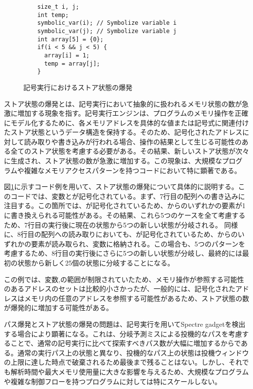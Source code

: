 \begin{figure}
  \begin{verbatim}
    size_t i, j;
    int temp;
    symbolic_var(i); // Symbolize variable i
    symbolic_var(j); // Symbolize variable j
    int array[5] = {0};
    if(i < 5 && j < 5) {
      array[i] = 1;
      temp = array[j];
    }
\end{verbatim}
  \caption{記号実行におけるストア状態の爆発}
  \label{store_explosion}
\end{figure}


ストア状態の爆発とは、記号実行において抽象的に扱われるメモリ状態の数が急激に増加する現象を指す。記号実行エンジンは、プログラムのメモリ操作を正確にモデル化するために、各メモリアドレスを具体的な値または記号式に関連付けたストア状態というデータ構造を保持する。そのため、記号化されたアドレスに対して読み取りや書き込みが行われる場合、操作の結果として生じる可能性のある全てのストア状態を考慮する必要がある。その結果、新しいストア状態が次々に生成され、ストア状態の数が急激に増加する。この現象は、大規模なプログラムや複雑なメモリアクセスパターンを持つコードにおいて特に顕著である。\par

図\ref{store_explosion}に示すコード例を用いて、ストア状態の爆発について具体的に説明する。このコードでは、変数とが記号化されている。まず、7行目の配列への書き込みに注目する。この箇所では、が記号化されているため、からのいずれかの要素が1に書き換えられる可能性がある。その結果、これら5つのケースを全て考慮するため、7行目の実行後に現在の状態から5つの新しい状態が分岐される。
同様に、8行目の配列への読み取りにおいても、が記号化されているため、からのいずれかの要素が読み取られ、変数に格納される。この場合も、5つのパターンを考慮するため、8行目の実行後にさらに5つの新しい状態が分岐し、最終的には最初の状態から新しく25個の状態に分岐することになる。\par
この例では、変数,の範囲が制限されていたため、メモリ操作が参照する可能性のあるアドレスのセットは比較的小さかったが、一般的には、記号化されたアドレスはメモリ内の任意のアドレスを参照する可能性があるため、ストア状態の数が爆発的に増加する可能性がある。\par
パス爆発とストア状態の爆発の問題は、記号実行を用いてSpectre gadgetを検出する場合により顕著になる。これは、分岐予測ミスによる投機的なパスを考慮することで、通常の記号実行に比べて探索すべきパス数が大幅に増加するからである。通常の実行パス上の状態と異なり、投機的なパス上の状態は投機ウィンドウの上限に達した時点で破棄されるため最後まで残ることはない。しかし、それでも解析時間や最大メモリ使用量に大きな影響を与えるため、大規模なプログラムや複雑な制御フローを持つプログラムに対しては特にスケールしない。\par

